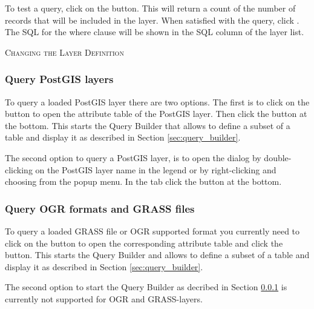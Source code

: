 To test a query, click on the  button. This will return a count of the number of records that will be
included in the layer. When satisfied with the query, click . The
SQL for the where clause will be shown in the SQL column of the layer list.

\begin{Tip}\caption{\textsc{Changing the Layer Definition}}
\end{Tip}

\subsubsection{Query PostGIS layers}\label{sec:query_builder_postgis}

To query a loaded PostGIS layer there are two options. The first is to click on the 
button  to open the attribute table of the PostGIS layer. Then 
click the  button at the bottom. This starts the Query Builder 
that allows to define a subset of a table and display it as described in Section 
\ref{sec:query_builder}.

The second option to query a PostGIS layer, is to open the  
dialog by double-clicking on the PostGIS layer name in the legend or 
by right-clicking and choosing  from the popup menu. In the tab 
 click the  button at the bottom.

\subsubsection{Query OGR formats and GRASS files}\label{sec:query_builder_ogrgrass}

To query a loaded GRASS file or OGR supported format you currently need to click on the 
button  to open the corresponding attribute table and click the 
 button. This starts the Query Builder and allows to define a 
subset of a table and display it as described in Section \ref{sec:query_builder}. 

The second option to start the Query Builder as decribed in Section 
\ref{sec:query_builder_postgis} is currently not supported for OGR and GRASS-layers.

